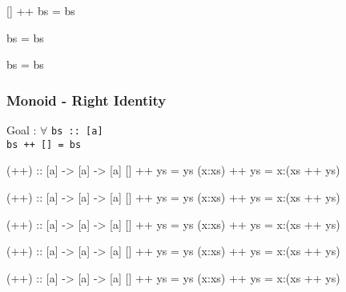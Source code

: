 \documentclass{beamer}
\newcommand{\ca}[1]{{\color{blue}#1}}
\newcommand{\cb}[1]{{\color{violet}#1}}
\newcommand{\cc}[1]{{\color{red}#1}}
\begin{document}
\begin{frame}[t,fragile]
\begin{center}
\begin{overprint}
\begin{semiverbatim}
\ca{[]} ++ \cb{bs} = bs
\end{semiverbatim}

\begin{semiverbatim}
      \cb{bs} = bs
\end{semiverbatim}

\begin{semiverbatim}
      \alert<8>{bs} = \alert<8>{bs}
\end{semiverbatim}

\end{overprint}
\end{center}

\end{frame}

\begin{frame}[t,fragile]
    \frametitle {Monoid - Right Identity}

\begingroup
\color{gray}\fontsize{10}{9.8}\selectfont

Goal : $\forall$ \verb?bs :: [a]? \\
    \quad \alert<3,13>{\Verb?bs ++ [] = bs?}

\vspace{10pt}

\begin{overprint}

\begin{semiverbatim}
(++) :: [a] -> [a] -> [a]
[]     ++ ys = ys
(x:xs) ++ ys = x:(xs ++ ys)
\end{semiverbatim}

\begin{semiverbatim}
(++) :: [a] -> [a] -> [a]
\ca{[]}     ++ \cb{ys} = ys
(x:xs) ++ ys = x:(xs ++ ys)
\end{semiverbatim}

\begin{semiverbatim}
(++) :: [a] -> [a] -> [a]
\ca{[]}     ++ \cb{ys} = \cb{ys}
(x:xs) ++ ys = x:(xs ++ ys)
\end{semiverbatim}

\begin{semiverbatim}
(++) :: [a] -> [a] -> [a]
[]     ++ ys = ys
(\ca{x}:\cb{xs}) ++ \cc{ys} = x:(xs ++ ys)
\end{semiverbatim}

\begin{semiverbatim}
(++) :: [a] -> [a] -> [a]
[]     ++ ys = ys
(\ca{x}:\cb{xs}) ++ \cc{ys} = \ca{x}:(\cb{xs} ++ \cc{ys})
\end{semiverbatim}


\end{overprint}
\end{frame}
\end{document}
